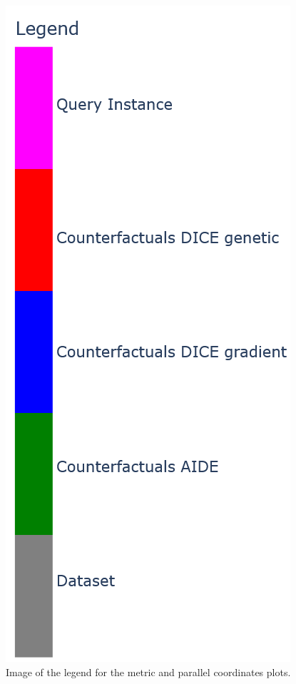 \begin{figure}[!htbp]
    \includegraphics[angle=90, width=\textwidth]{images/legend.png}
    \caption{Image of the legend for the metric and parallel coordinates plots.}
    \label{fig:legend-plots}
\end{figure}

